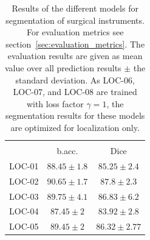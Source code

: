 \begin{table}
\centering
 \begin{tabular}{l c c } 
 \hline\noalign{\smallskip}
 \multicolumn{3}{c}{\textbf{Segmentation Results LocNet}} \\
 & {b.acc.} & Dice \\ [0.5ex]
 \hline\noalign{\smallskip}
 LOC-01 & $88.45 \pm 1.8$ &$85.25 \pm 2.4$ \\ 
 LOC-02 & $\mathbf{90.65 \pm 1.7}$ & $\mathbf{87.8 \pm 2.3}$ \\ 
 LOC-03 & $89.75 \pm 4.1$  & $86.83 \pm 6.2$ \\ 
 LOC-04 & $87.45 \pm 2$ & $83.92 \pm 2.8$ \\
 LOC-05 & $89.45 \pm 2$ & $86.32 \pm 2.77$ \\ [0.5ex]
 \hline 
 \end{tabular}  
\caption[LocNet segmentation results]{Results of the different models for segmentation of surgical instruments. For evaluation metrics see section~\ref{sec:evaluation_metrics}. The evaluation results are given as mean value over all prediction results $\pm$ the standard deviation. As LOC-06, LOC-07, and LOC-08 are trained with loss factor $\gamma=1$, the segmentation results for these models are optimized for localization only.}
\label{tab:segm_results_locnet}
\end{table}

